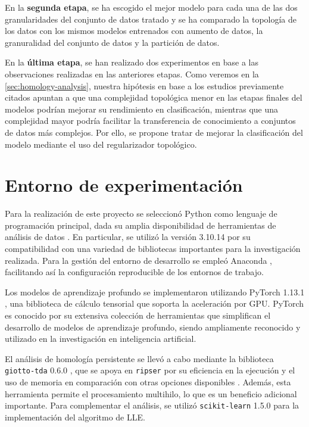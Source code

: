 En la \textbf{segunda etapa}, se ha escogido el mejor modelo para cada una de las dos granularidades del conjunto de datos tratado y se ha comparado la topología de los datos con los mismos modelos entrenados con aumento de datos, la granuralidad del conjunto de datos y la partición de datos.
	
En la \textbf{última etapa}, se han realizado dos experimentos en base a las observaciones realizadas en las anteriores etapas. Como veremos en la \autoref{sec:homology-analysis}, nuestra hipótesis en base a los estudios previamente citados apuntan a que una complejidad topológica menor en las etapas finales del modelos podrían mejorar su rendimiento en clasificación, mientras que una complejidad mayor podría facilitar la transferencia de conocimiento a conjuntos de datos más complejos. Por ello, se propone tratar de mejorar la clasificación del modelo mediante el uso del regularizador topológico.

\section{Entorno de experimentación}

Para la realización de este proyecto se seleccionó Python como lenguaje de programación principal, dada su amplia disponibilidad de herramientas de análisis de datos \cite{10.5555/1593511}. En particular, se utilizó la versión 3.10.14 por su compatibilidad con una variedad de bibliotecas importantes para la investigación realizada. Para la gestión del entorno de desarrollo se empleó Anaconda \cite{anaconda}, facilitando así la configuración reproducible de los entornos de trabajo.

Los modelos de aprendizaje profundo se implementaron utilizando PyTorch 1.13.1 \cite{NEURIPS2019_9015}, una biblioteca de cálculo tensorial que soporta la aceleración por GPU. PyTorch es conocido por su extensiva colección de herramientas que simplifican el desarrollo de modelos de aprendizaje profundo, siendo ampliamente reconocido y utilizado en la investigación en inteligencia artificial.

El análisis de homología persistente se llevó a cabo mediante la biblioteca \texttt{giotto-tda} 0.6.0 \cite{giotto-tda}, que se apoya en \texttt{ripser} \cite{ctralie2018ripser} por su eficiencia en la ejecución y el uso de memoria en comparación con otras opciones disponibles \cite{Otter_2017}. Además, esta herramienta permite el procesamiento multihilo, lo que es un beneficio adicional importante. Para complementar el análisis, se utilizó \texttt{scikit-learn} 1.5.0 para la implementación del algoritmo de LLE.

